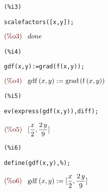 \documentclass[12pt]{article}
\begin{document}
\noindent
\begin{minipage}[t]{8ex}{\color{red}\bf
\begin{verbatim}
(%i3) 
\end{verbatim}}
\end{minipage}
\begin{minipage}[t]{\textwidth}{\color{blue}
\begin{verbatim}
scalefactors([x,y]);
\end{verbatim}}
\end{minipage}
\begin{math}\displaystyle
\parbox{8ex}{\color{labelcolor}(\%o3) }
done
\end{math}


\noindent
\begin{minipage}[t]{8ex}{\color{red}\bf
\begin{verbatim}
(%i4) 
\end{verbatim}}
\end{minipage}
\begin{minipage}[t]{\textwidth}{\color{blue}
\begin{verbatim}
gdf(x,y):=grad(f(x,y));
\end{verbatim}}
\end{minipage}
\begin{math}\displaystyle
\parbox{8ex}{\color{labelcolor}(\%o4) }
\mathrm{gdf}\left( x,y\right) :=\mathrm{grad}\left( \mathrm{f}\left( x,y\right) \right) 
\end{math}


\noindent
\begin{minipage}[t]{8ex}{\color{red}\bf
\begin{verbatim}
(%i5) 
\end{verbatim}}
\end{minipage}
\begin{minipage}[t]{\textwidth}{\color{blue}
\begin{verbatim}
ev(express(gdf(x,y)),diff);
\end{verbatim}}
\end{minipage}
\begin{math}\displaystyle
\parbox{8ex}{\color{labelcolor}(\%o5) }
[\frac{x}{2},\frac{2\,y}{9}]
\end{math}


\noindent
\begin{minipage}[t]{8ex}{\color{red}\bf
\begin{verbatim}
(%i6) 
\end{verbatim}}
\end{minipage}
\begin{minipage}[t]{\textwidth}{\color{blue}
\begin{verbatim}
define(gdf(x,y),%);
\end{verbatim}}
\end{minipage}
\begin{math}\displaystyle
\parbox{8ex}{\color{labelcolor}(\%o6) }
\mathrm{gdf}\left( x,y\right) :=[\frac{x}{2},\frac{2\,y}{9}]
\end{math}
\end{document}
